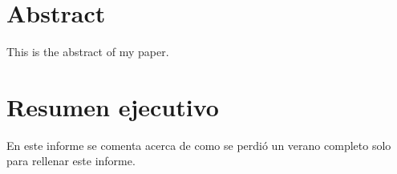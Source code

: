 %
\section*{Abstract}
This is the abstract of my paper.
\newpage

\section*{Resumen ejecutivo}
En este informe se comenta acerca de como se perdió un verano completo solo para rellenar este informe.
